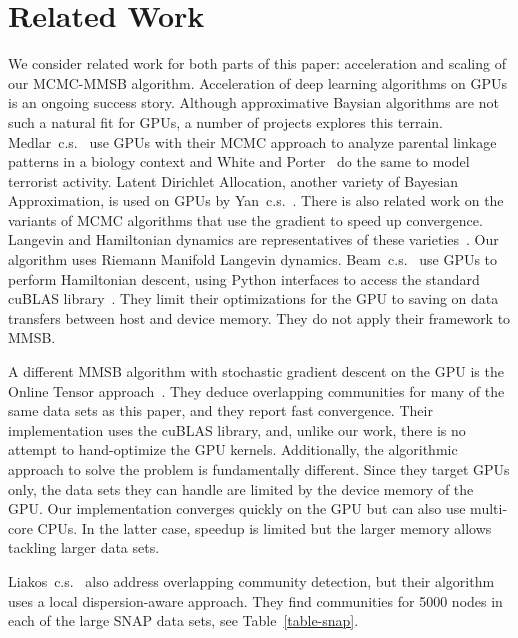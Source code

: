 \section{Related Work}
\label{sec-related}

We consider related work for both parts of this paper: acceleration and scaling
of our MCMC-MMSB algorithm. Acceleration of deep learning algorithms on GPUs
is an ongoing success story. Although approximative Baysian algorithms are
not such a natural fit for GPUs, a number of projects explores this terrain.
Medlar~c.s.~\cite{journals/bioinformatics/MedlarGSBK13} use GPUs with their
MCMC approach to analyze parental linkage patterns in a biology context and
White and Porter~\cite{DBLP:journals/csda/WhiteP14} do the same to model terrorist activity.
Latent Dirichlet Allocation, another variety of Bayesian Approximation,
is used on GPUs by Yan~c.s.~\cite{DBLP:conf/nips/YanXQ09}. There is also related
work on the variants of MCMC algorithms that use the gradient to speed
up convergence. Langevin and Hamiltonian dynamics are representatives of
these varieties~\cite{Girolami_riemannmanifold}. Our algorithm uses Riemann
Manifold Langevin dynamics. Beam~c.s.~\cite{beam2014fast} use GPUs to perform
Hamiltonian descent, using Python interfaces to access the standard cuBLAS
library~\cite{cuBLAS}. They limit their optimizations for the GPU to saving
on data transfers between host and device memory. They do not apply their
framework to MMSB.

A different MMSB algorithm with stochastic gradient descent on the GPU is
the Online Tensor approach~\cite{DBLP:journals/corr/HuangNHVA13}. They deduce
overlapping communities for many of the same data sets as this paper, and they
report fast convergence. Their implementation uses the cuBLAS
library, and, unlike our work, there is no attempt to hand-optimize the GPU
kernels. Additionally, the algorithmic approach to solve the problem is
fundamentally different.
Since they target GPUs only, the data sets they
can handle are limited by the device memory of the GPU. Our implementation converges
quickly on the GPU but can also use multi-core CPUs. In the latter case, speedup is
limited but the larger memory allows tackling larger data sets.

Liakos~c.s.~\cite{liakos-bigdata16} also address overlapping community detection, but their
algorithm uses a local dispersion-aware approach. They find communities for 5000
nodes in each of the large SNAP data sets, see Table~\ref{table-snap}.


